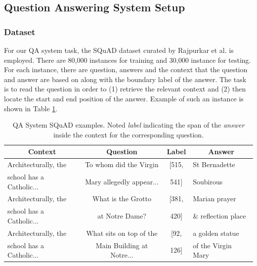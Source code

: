 \subsection{Question Answering System Setup}

\subsubsection{Dataset}

For our QA system task, the SQuAD dataset curated by Rajpurkar et al. \cite{squad} is employed. There are 80,000 instances for training and 30,000 instance for testing. For each instance, there are question, answers and the context that the question and answer are based on along with the boundary label of the answer. The task is to read the question in order to (1) retrieve the relevant context and (2) then locate the start and end position of the answer. Example of such an instance is shown in Table \ref{tbl:qasystem}. 

\begin{table}[!b]
\vspace{-5pt}
\scriptsize
\vspace{7pt}
\caption{QA System SQuAD examples. Noted \textit{label} indicating the span of the \textit{answer} inside the context for the corresponding question. }\label{tbl:qasystem}
\vspace{-10pt}
\begin{center}
\begin{tabular}{ l|c|c|l}
 \multicolumn{1}{c|}{Context} &
 \multicolumn{1}{c|}{Question} &
 \multicolumn{1}{c|}{Label} &
 \multicolumn{1}{c}{Answer}\\
\hline
Architecturally, the  & To whom did the Virgin  & [515,  & St Bernadette 
\\
school has a Catholic...  & Mary allegedly appear... & 541] & Soubirous \\ \hline

Architecturally, the  & What is the Grotto  & [381,  & Marian prayer 
\\
school has a Catholic...  & at Notre Dame? & 420] & \& reflection place \\ \hline

Architecturally, the  & What sits on top of the	  & [92,  & a golden statue 
\\
school has a Catholic...  & Main Building at Notre... & 126] & of the Virgin Mary \\ 

\end{tabular}
\end{center}
\vspace{-15pt}
\end{table}


